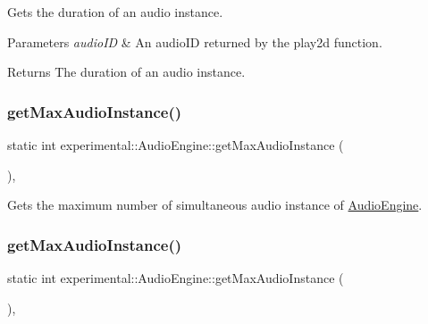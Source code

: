 Gets the duration of an audio instance.


\begin{DoxyParams}{Parameters}
{\em audio\+ID} & An audio\+ID returned by the play2d function. \\
\hline
\end{DoxyParams}
\begin{DoxyReturn}{Returns}
The duration of an audio instance. 
\end{DoxyReturn}
\mbox{\label{classexperimental_1_1AudioEngine_aa372906cea71863ac9c75873477ab049}} 
\subsubsection{\texorpdfstring{get\+Max\+Audio\+Instance()}{getMaxAudioInstance()}\hspace{0.1cm}{\footnotesize\ttfamily [1/2]}}
{\footnotesize\ttfamily static int experimental\+::\+Audio\+Engine\+::get\+Max\+Audio\+Instance (\begin{DoxyParamCaption}{ }\end{DoxyParamCaption})\hspace{0.3cm}{\ttfamily [inline]}, {\ttfamily [static]}}

Gets the maximum number of simultaneous audio instance of \hyperlink{classexperimental_1_1AudioEngine}{Audio\+Engine}. \mbox{\label{classexperimental_1_1AudioEngine_aa372906cea71863ac9c75873477ab049}} 
\subsubsection{\texorpdfstring{get\+Max\+Audio\+Instance()}{getMaxAudioInstance()}\hspace{0.1cm}{\footnotesize\ttfamily [2/2]}}
{\footnotesize\ttfamily static int experimental\+::\+Audio\+Engine\+::get\+Max\+Audio\+Instance (\begin{DoxyParamCaption}{ }\end{DoxyParamCaption})\hspace{0.3cm}{\ttfamily [inline]}, {\ttfamily [static]}}

